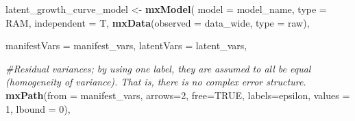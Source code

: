 \documentclass[
12pt, %
twoside,
english]{guelphthesis}
\newenvironment{Shaded}{\begin{snugshade}}{\end{snugshade}}
\newcommand{\AttributeTok}[1]{\textcolor[rgb]{0.13,0.29,0.53}{#1}}
\newcommand{\CommentTok}[1]{\textcolor[rgb]{0.56,0.35,0.01}{\textit{#1}}}
\newcommand{\ConstantTok}[1]{\textcolor[rgb]{0.56,0.35,0.01}{#1}}
\newcommand{\DecValTok}[1]{\textcolor[rgb]{0.00,0.00,0.81}{#1}}
\newcommand{\FunctionTok}[1]{\textcolor[rgb]{0.13,0.29,0.53}{\textbf{#1}}}
\newcommand{\NormalTok}[1]{#1}
\newcommand{\OtherTok}[1]{\textcolor[rgb]{0.56,0.35,0.01}{#1}}
\newcommand{\StringTok}[1]{\textcolor[rgb]{0.31,0.60,0.02}{#1}}
\begin{document}
\begin{Shaded}
\begin{Highlighting}[numbers=left,,]
\NormalTok{latent\_growth\_curve\_model }\OtherTok{\textless{}{-}} \FunctionTok{mxModel}\NormalTok{(}
  \AttributeTok{model =}\NormalTok{ model\_name,}
  \AttributeTok{type =} \StringTok{\textquotesingle{}RAM\textquotesingle{}}\NormalTok{, }\AttributeTok{independent =}\NormalTok{ T,}
  \FunctionTok{mxData}\NormalTok{(}\AttributeTok{observed =}\NormalTok{ data\_wide, }\AttributeTok{type =} \StringTok{\textquotesingle{}raw\textquotesingle{}}\NormalTok{),}
  
  \AttributeTok{manifestVars =}\NormalTok{ manifest\_vars,}
  \AttributeTok{latentVars =}\NormalTok{ latent\_vars,}
  
  \CommentTok{\#Residual variances; by using one label, they are assumed to all be equal (homogeneity of variance). That is, there is no complex error structure. }
  \FunctionTok{mxPath}\NormalTok{(}\AttributeTok{from =}\NormalTok{ manifest\_vars,}
         \AttributeTok{arrows=}\DecValTok{2}\NormalTok{, }\AttributeTok{free=}\ConstantTok{TRUE}\NormalTok{,  }\AttributeTok{labels=}\StringTok{\textquotesingle{}epsilon\textquotesingle{}}\NormalTok{, }\AttributeTok{values =} \DecValTok{1}\NormalTok{, }\AttributeTok{lbound =} \DecValTok{0}\NormalTok{),}
  

\end{Highlighting}
\end{Shaded}
\end{document}

